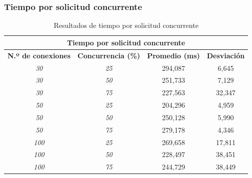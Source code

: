 \subsubsection{Tiempo por solicitud concurrente}
\begin{table}[!ht]
	\begin{center}
		\begin{tabular}{|c|c|c|c|}
			\hline
			\multicolumn{4}{|c|}{{\bf Tiempo por solicitud concurrente}}                               \\ \hline
			{\bf N.º de conexiones} & {\bf Concurrencia (\%)} & {\bf Promedio (ms)} & {\bf Desviación} \\ \hline
			{\it 30}                & {\it 25}                & 294,087             & 6,645            \\ \hline
			{\it 30}                & {\it 50}                & 251,733             & 7,129            \\ \hline
			{\it 30}                & {\it 75}                & 227,563             & 32,347           \\ \hline
			{\it 50}                & {\it 25}                & 204,296             & 4,959            \\ \hline
			{\it 50}                & {\it 50}                & 250,128             & 5,990            \\ \hline
			{\it 50}                & {\it 75}                & 279,178             & 4,346            \\ \hline
			{\it 100}               & {\it 25}                & 269,658             & 17,811           \\ \hline
			{\it 100}               & {\it 50}                & 228,497             & 38,451           \\ \hline
			{\it 100}               & {\it 75}                & 244,729             & 38,449           \\ \hline
		\end{tabular}
		\caption{Resultados de tiempo por solicitud concurrente}
		\label{table:rtsc}
	\end{center}
\end{table}


